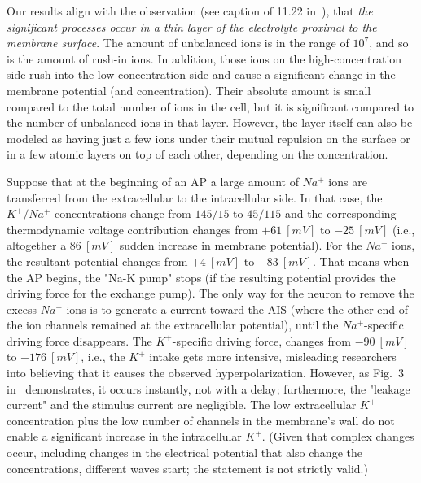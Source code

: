 Our results align with the observation (see caption of 11.22 in~\cite{MolecularBiology:2002}), that \textit{the significant processes
	occur in a thin layer of the electrolyte proximal to the membrane surface}.
The amount of unbalanced ions is in the range of $10^7$,
and so is the amount of rush-in ions. In addition, those 
ions on the high-concentration side rush into the 
low-concentration side and cause a significant change in the 
membrane potential (and concentration). Their absolute amount is small compared to the total number of ions in the cell,
but it is significant compared to the number of unbalanced ions in that layer.
However, the layer itself can also be modeled
as having just a few ions under their mutual repulsion on the surface
or in a few atomic layers on top of each other, depending on the concentration.



Suppose that at the beginning of an \gls{AP} a large amount of $Na^+$ ions are transferred from the extracellular to the intracellular side. In that case,  the $K^+/Na^+$ concentrations change from $145/15$ to $45/115$ and the 
corresponding thermodynamic voltage contribution changes from $+61\ [mV]$ to $-25\ [mV]$ (i.e., altogether a $86\ [mV]$ sudden increase in membrane potential). For the $Na^+$ ions, the resultant potential changes from $+4\ [mV]$ to $-83\ [mV]$. That means when the \gls{AP} begins, the "Na-K pump" stops (if the resulting potential provides the driving force for the exchange pump). The only way for the neuron to remove the excess  $Na^+$ ions is to generate a current toward the \gls{AIS} (where the other end of the ion channels remained at the extracellular potential), until the $Na^+$-specific driving force disappears. The $K^+$-specific driving force, changes from $-90\ [mV]$ to  $-176\ [mV]$, i.e., the $K^+$
intake gets more intensive, misleading researchers into believing that it causes
the observed hyperpolarization. However, as  Fig.~3 in~\cite{NeuralEnergyConsumption:2017} demonstrates, it occurs instantly, not with a delay; furthermore, the "leakage current" and the stimulus current are negligible. The low extracellular $K^+$ concentration plus the 
low number of channels in the membrane's wall
do not enable a significant increase in the intracellular $K^+$. 
(Given that complex changes occur, including changes in the electrical potential that also change the concentrations, different waves start; the statement is not strictly valid.)

